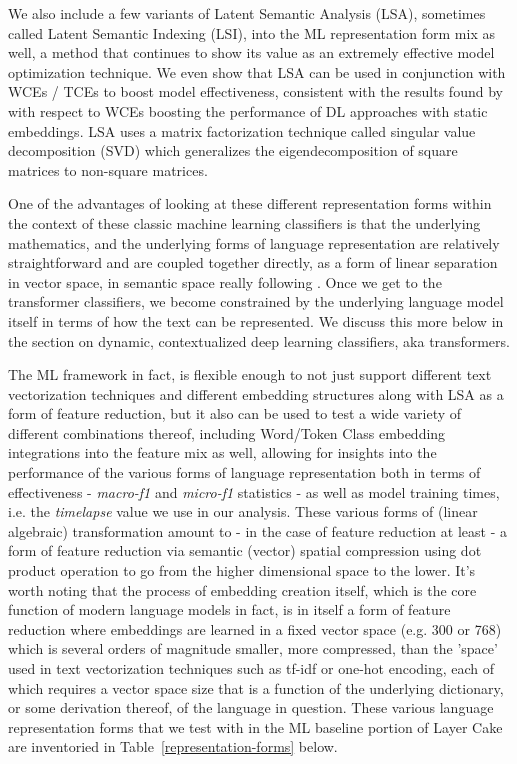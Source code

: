 \documentclass[final]{clv2025-revised}
\begin{document}
We also include a few variants of Latent Semantic Analysis (LSA), sometimes called Latent Semantic Indexing (LSI), \cite{deerwester} into the ML representation form mix as well, a method that continues to show its value as an extremely effective model optimization technique. We even show that LSA can be used in conjunction with WCEs / TCEs to boost model effectiveness, consistent with the results found by \cite{moreo2021} with respect to WCEs boosting the performance of DL approaches with static embeddings. LSA uses a matrix factorization technique called singular value decomposition (SVD) which generalizes the eigendecomposition of square matrices to non-square matrices. 

One of the advantages of looking at these different representation forms within the context of these classic machine learning classifiers is that the underlying mathematics, and the underlying forms of language representation are relatively straightforward and are coupled together directly, as a form of linear separation in vector space, in semantic space really following \cite{worth}. Once we get to the transformer classifiers, we become constrained by the underlying language model itself in terms of how the text can be represented. We discuss this more below in the section on dynamic, contextualized deep learning classifiers, aka transformers.

The ML framework in fact, is flexible enough to not just support different text vectorization techniques and different embedding structures along with LSA as a form of feature reduction, but it also can be used to test a wide variety of different combinations thereof, including Word/Token Class embedding integrations into the feature mix as well, allowing for insights into the performance of the various forms of language representation both in terms of effectiveness - \textit{macro-f1} and \textit{micro-f1} statistics - as well as model training times, i.e. the \textit{timelapse} value we use in our analysis. These various forms of (linear algebraic) transformation amount to - in the case of feature reduction at least - a form of feature reduction via semantic (vector) spatial compression using dot product operation to go from the higher dimensional space to the lower. It's worth noting that the process of embedding creation itself, which is the core function of modern language models in fact, is in itself a form of feature reduction where embeddings are learned in a fixed vector space (e.g. 300 or 768) which is several orders of magnitude smaller, more compressed, than the 'space' used in text vectorization techniques such as tf-idf or one-hot encoding, each of which requires a vector space size that is a function of the underlying dictionary, or some derivation thereof, of the language in question. These various language representation forms that we test with in the ML baseline portion of Layer Cake are inventoried in Table~\ref{representation-forms} below.
\end{document}
